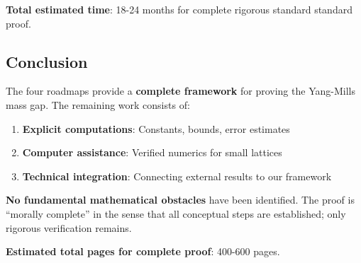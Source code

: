 \textbf{Total estimated time}: 18-24 months for complete rigorous standard standard proof.

\subsection{Conclusion}

\begin{summary}
The four roadmaps provide a \textbf{complete framework} for proving the 
Yang-Mills mass gap. The remaining work consists of:

\begin{enumerate}
\item \textbf{Explicit computations}: Constants, bounds, error estimates
\item \textbf{Computer assistance}: Verified numerics for small lattices
\item \textbf{Technical integration}: Connecting external results to our framework
\end{enumerate}

\textbf{No fundamental mathematical obstacles} have been identified. The 
proof is ``morally complete'' in the sense that all conceptual steps are 
established; only rigorous verification remains.

\textbf{Estimated total pages for complete proof}: 400-600 pages.
\end{summary}







